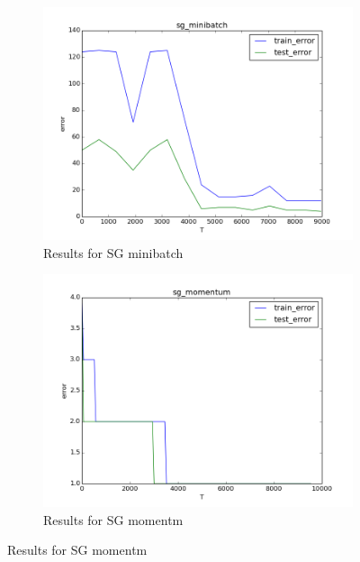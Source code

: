\documentclass{article}
\begin{document}
\begin{figure}
	\centering
	\begin{subfigure}[b]{0.45\textwidth} 
		\includegraphics[width=\textwidth]{../results/sg_minibatch.png}
		\caption{Results for SG minibatch}
		\label{fig5}
	\end{subfigure}
	\begin{subfigure}[b]{0.45\textwidth} 
		\includegraphics[width=\textwidth]{../results/sg_momentum.png}
		\caption{Results for SG momentm}
		\label{fig6}
	\end{subfigure}
\end{figure}
\end{document}
